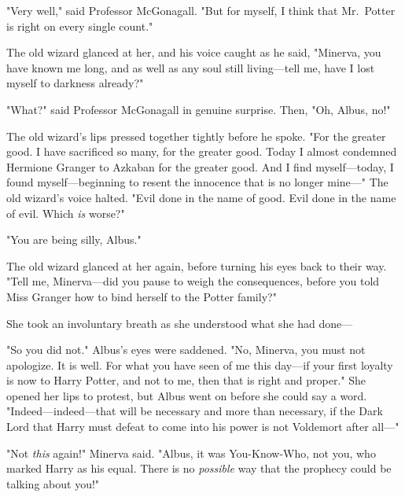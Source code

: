 "Very well," said Professor McGonagall. "But for myself, I think that
Mr.~Potter is right on every single count."

The old wizard glanced at her, and his voice caught as he said, "Minerva, you
have known me long, and as well as any soul still living---tell me, have I lost
myself to darkness already?"

"What?" said Professor McGonagall in genuine surprise. Then, "Oh, Albus, no!"

The old wizard's lips pressed together tightly before he spoke. "For the
greater good. I have sacrificed so many, for the greater good. Today I almost
condemned Hermione Granger to Azkaban for the greater good. And I find
myself---today, I found myself---beginning to resent the innocence that is no
longer mine---" The old wizard's voice halted. "Evil done in the name of good.
Evil done in the name of evil. Which \emph{is} worse?"

"You are being silly, Albus."

The old wizard glanced at her again, before turning his eyes back to their way.
"Tell me, Minerva---did you pause to weigh the consequences, before you told
Miss Granger how to bind herself to the Potter family?"

She took an involuntary breath as she understood what she had done---

"So you did not." Albus's eyes were saddened. "No, Minerva, you must not
apologize. It is well. For what you have seen of me this day---if your first
loyalty is now to Harry Potter, and not to me, then that is right and proper."
She opened her lips to protest, but Albus went on before she could say a word.
"Indeed---indeed---that will be necessary and more than necessary, if the Dark
Lord that Harry must defeat to come into his power is not Voldemort after
all---"

"Not \emph{this} again!" Minerva said. "Albus, it was You-Know-Who, not you,
who marked Harry as his equal. There is no \emph{possible} way that the
prophecy could be talking about you!"

